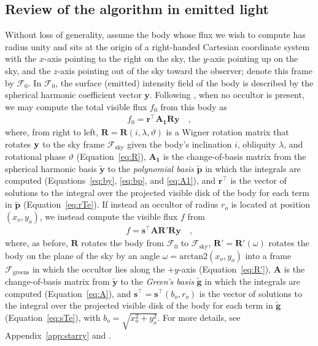 \documentclass[modern]{aastex62}
\newcommand{\BF}[1]{\ensuremath{\mathbf{#1}}}
\newcommand{\sTe}{\ensuremath{\BF{s}^\top}}
\newcommand{\rTe}{\ensuremath{\BF{r}^\top}}
\newcommand{\bg}{\ensuremath{\tilde{\BF{g}}}}
\newcommand{\bp}{\ensuremath{\tilde{\BF{p}}}}
\newcommand{\by}{\ensuremath{\tilde{\BF{y}}}}
\begin{document}
\subsection{Review of the \starry algorithm in emitted light}
\label{sec:starry-review}
%
Without loss of generality, assume the body whose flux we wish to compute
has radius unity and sits at the origin of a right-handed Cartesian coordinate
system with the $x$-axis pointing to the right on the sky, the $y$-axis
pointing up on the sky, and the $z$-axis pointing out of the sky
toward the observer; denote this frame by $\mathcal{F}_0$. In $\mathcal{F}_0$,
the surface (emitted) intensity field of the body is described by the
spherical harmonic coefficient vector $\mathbf{y}$. Following
\citet{Luger2019}, when no occultor is present, we may compute the total
visible flux $f_0$ from this body as
%
\begin{align}
    \label{eq:rTA1Ry}
    f_0 = \rTe \BF{A_1} \BF{R} \BF{y}
    \quad,
\end{align}
%
where, from right to left, $\BF{R} = \BF{R}(i, \lambda, \vartheta)$
is a Wigner rotation matrix that rotates ${\mathbf{y}}$ to the sky frame
$\mathcal{F}_\mathrm{sky}$ given the body's inclination $i$, obliquity
$\lambda$, and rotational phase $\vartheta$ (Equation~\ref{eq:R}),
%
$\BF{A_1}$ is the change-of-basis matrix from the spherical harmonic
basis $\by$ to the \emph{polynomial basis} $\bp$ in which the integrals
are computed (Equations~\ref{eq:by}, \ref{eq:bp}, and \ref{eq:A1}),
%
and $\rTe$ is the vector of solutions to the integral over
the projected visible disk of the body for each term in $\bp$
(Equation~\ref{eq:rTe}).
%
If instead an occultor of radius $r_o$ is located at position $(x_o, y_o)$,
we instead compute the visible flux $f$ from
%
\begin{align}
    \label{eq:sTARRy}
    f = \sTe \BF{A} \BF{R}' \BF{R} \BF{y}
    \quad,
\end{align}
%
where, as before, $\BF{R}$ rotates the body from $\mathcal{F}_0$
to $\mathcal{F}_\mathrm{sky}$,
%
$\BF{R}' = \BF{R}'(\omega)$ rotates the body on the plane
of the sky by an angle
$\omega = \mathrm{arctan2}(x_o, y_o)$
into a frame $\mathcal{F}_\mathrm{greens}$ in which the
occultor lies along the $+y$-axis (Equation~\ref{eq:R'}),
%
$\BF{A}$ is the change-of-basis matrix from $\by$
to the \emph{Green's basis} $\bg$ in which the integrals are computed
(Equation~\ref{eq:A}),
%
and $\sTe = \sTe(b_o, r_o)$ is the vector of solutions to the integral over
the projected visible disk of the body for each term in $\bg$
(Equation~\ref{eq:sTe}), with $b_o = \sqrt{x_o^2 + y_o^2}$.
For more details, see Appendix~\ref{app:starry} and \citet{Luger2019}.
\end{document}
